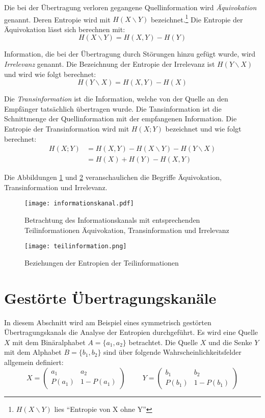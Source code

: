Die bei der Übertragung verloren gegangene Quellinformation wird \textsl{Äquivokation} genannt. Deren Entropie wird mit $H(X \backslash Y)$ bezeichnet.\footnote{$H(X \backslash Y)$ lies "`Entropie von X ohne Y"'} Die Entropie der Äquivokation lässt sich berechnen mit:
$$ H(X \backslash Y) = H(X, Y) - H(Y) $$

Information, die bei der Übertragung durch Störungen hinzu gefügt wurde, wird \textit{Irrelevanz} genannt. Die Bezeichnung der Entropie der Irrelevanz ist $H(Y \backslash X)$ und wird wie folgt berechnet:
$$H(Y \backslash X) = H(X, Y) - H(X)$$

Die \textsl{Transinformation} ist die Information, welche von der Quelle an den Empfänger tatsächlich übertragen wurde. Die Tansinformation ist die Schnittmenge der Quellinformation mit der empfangenen Information. Die Entropie der Transinformation wird mit $H(X;Y)$ bezeichnet und wie folgt berechnet: 
\begin{align*}
	H(X;Y) &= H(X,Y) - H(X \backslash Y) 
		- H(Y \backslash X) \\
	       &= H(X) + H(Y) - H(X,Y)
\end{align*}


Die Abbildungen \ref{infokanal} und \ref{teilinfo} veranschaulichen die Begriffe Äquivokation, Transinformation und Irrelevanz.
\begin{figure}[htbp] %
	\centering
	\texttt{[image: informationskanal.pdf]}
	\caption{Betrachtung des Informationskanals mit entsprechenden Teilinformationen Äquivokation, Transinformation und Irrelevanz}
	\label{infokanal}
\end{figure}
\begin{figure}[htbp] %
	\centering
	\texttt{[image: teilinformation.png]}
	\caption{Beziehungen der Entropien der Teilinformationen}
	\label{teilinfo}
\end{figure}


\newpage
\section{Gestörte Übertragungskanäle}
In diesem Abschnitt wird am Beispiel eines symmetrisch gestörten Übertragungskanals die Analyse der Entropien durchgeführt. Es wird eine Quelle $X$ mit dem Binäralphabet $A = \{a_1,a_2\}$ betrachtet. Die Quelle $X$ und die Senke $Y$ mit dem Alphabet $B = \{b_1, b_2\}$ sind über folgende Wahrscheinlichkeitsfelder allgemein definiert:
$$
	X =
	\left(
	\begin{array}{cc}
		a_1    & a_2 \\
		P(a_1) & 1-P(a_1)
	\end{array}
	\right)
	\hspace{1cm}
	Y = 
	\left(
	\begin{array}{cc}
		b_1    & b_2 \\
		P(b_1) & 1-P(b_1)
	\end{array}
	\right)
$$

